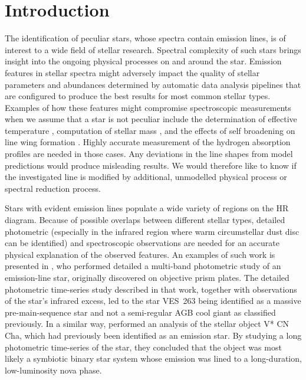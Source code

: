 \section{Introduction}
\label{sec:intro_emis}
The identification of peculiar stars, whose spectra contain emission lines, is of interest to a wide field of stellar research. Spectral complexity of such stars brings insight into the ongoing physical processes on and around the star. Emission features in stellar spectra might adversely impact the quality of stellar parameters and abundances determined by automatic data analysis pipelines that are configured to produce the best results for most common stellar types. Examples of how these features might compromise spectroscopic measurements when we assume that a star is not peculiar include the determination of effective temperature \citep{2011A&A...531A..83C, 2018A&A...615A.139A, 2019A&A...624A..10G}, computation of stellar mass \citep{2016ApJ...823..114N, 2016A&A...594A.120B}, and the effects of self broadening on line wing formation \citep{2000A&A...363.1091B, 2008A&A...480..581A}. Highly accurate measurement of the hydrogen absorption profiles are needed in those cases. Any deviations in the line shapes from model predictions would produce misleading results. We would therefore like to know if the investigated line is modified by additional, unmodelled physical process or spectral reduction process.

Stars with evident emission lines populate a wide variety of regions on the HR diagram. Because of possible overlaps between different stellar types, detailed photometric (especially in the infrared region where warm circumstellar dust disc can be identified) and spectroscopic observations are needed for an accurate physical explanation of the observed features. An examples of such work is presented in \citet{2019MNRAS.488.5536M}, who performed detailed a multi-band photometric study of an emission-line star, originally discovered on objective prism plates. The detailed photometric time-series study described in that work, together with observations of the star's infrared excess, led to the star VES~263 being identified as a massive pre-main-sequence star and not a semi-regular AGB cool giant as classified previously. In a similar way, \citet{2020arXiv200207852L} performed an analysis of the stellar object V* CN Cha, which had previously been identified as an emission star. By studying a long photometric time-series of the star, they concluded that the object was most likely a symbiotic binary star system whose emission was lined to a long-duration, low-luminosity nova phase.


